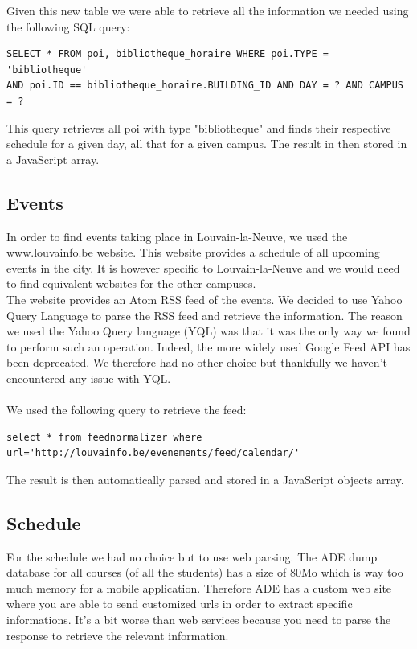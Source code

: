 \documentclass{eplmastersthesis}
\begin{document}
Given this new table we were able to retrieve all the information we needed using the following SQL query:
\begin{verbatim}
SELECT * FROM poi, bibliotheque_horaire WHERE poi.TYPE = 'bibliotheque' 
AND poi.ID == bibliotheque_horaire.BUILDING_ID AND DAY = ? AND CAMPUS = ?
\end{verbatim}

This query retrieves all poi with type "bibliotheque" and finds their respective schedule for a given day, all that for a given campus. The result in then stored in a JavaScript array.

\subsection{Events}

In order to find events taking place in Louvain-la-Neuve, we used the www.louvainfo.be website. This website provides a schedule of all upcoming events in the city. It is however specific to Louvain-la-Neuve and we would need to find equivalent websites for the other campuses. \\ The website provides an Atom RSS feed of the events. We decided to use Yahoo Query Language to parse the RSS feed and retrieve the information. The reason we used the Yahoo Query language (YQL) was that it was the only way we found to perform such an operation. Indeed, the more widely used Google Feed API has been deprecated. We therefore had no other choice but thankfully we haven't encountered any issue with YQL.\\
\\We used the following query to retrieve the feed:
\begin{verbatim}
select * from feednormalizer where url='http://louvainfo.be/evenements/feed/calendar/'
\end{verbatim}
The result is then automatically parsed and stored in a JavaScript objects array. 

\subsection{Schedule}
For the schedule we had no choice but to use web parsing. The ADE dump database for all courses (of all the students) has a size of 80Mo which is way too much memory for a mobile application. Therefore ADE has a custom web site where you are able to send customized urls in order to extract specific informations. It's a bit worse than web services because you need to parse the response to retrieve the relevant information.
\end{document}
